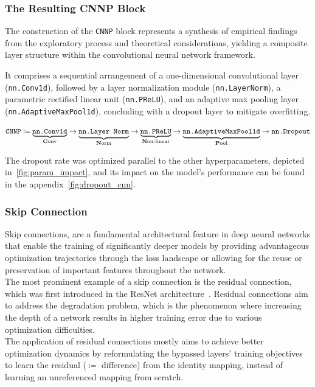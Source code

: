\subsubsection{The Resulting CNNP Block}
\label{subsubsec:cnn_block}

The construction of the \texttt{CNNP} block represents a synthesis of empirical findings from the exploratory process
and theoretical considerations, yielding a composite layer structure within the convolutional neural network framework.

It comprises a sequential arrangement of a one-dimensional convolutional layer (\texttt{nn.Conv1d}), followed by a
layer normalization module (\texttt{nn.LayerNorm}), a parametric rectified linear unit (\texttt{nn.PReLU}), and an
adaptive max pooling layer (\texttt{nn.AdaptiveMaxPool1d}), concluding with a dropout layer to mitigate overfitting.

\[
    \texttt{CNNP} \coloneqq \underbrace{\texttt{nn.Conv1d}}_{\text{\textbf{C}onv}}
    \rightarrow \underbrace{\texttt{nn.Layer Norm}}_{\text{\textbf{N}orm}}
    \rightarrow \underbrace{\texttt{nn.PReLU}}_{\text{\textbf{N}on-linear}}
    \rightarrow \underbrace{\texttt{nn.AdaptiveMaxPool1d}}_{\text{\textbf{P}ool}}
    \rightarrow \texttt{nn.Dropout}
\]

The dropout rate was optimized parallel to the other hyperparameters, depicted in~\autoref{fig:param_impact}, and its
impact on the model's performance can be found in the appendix~\autoref{fig:dropout_cnn}.


\subsubsection{Skip Connection}

Skip connections, are a fundamental architectural feature in deep neural networks that enable the training of significantly
deeper models by providing advantageous optimization trajectories through the loss landscape or allowing for the reuse or
preservation of important features throughout the network. \\
The most prominent example of a skip connection is the residual connection, which was first introduced in the ResNet architecture~\cite{he2015deep}.
Residual connections aim to address the degradation problem, which is the phenomenon where increasing the depth of a network
results in higher training error due to various optimization difficulties. \\
The application of residual connections mostly aims to achieve better optimization dynamics by reformulating the
bypassed layers' training objectives to learn the residual (\( \coloneq \) difference) from the identity mapping, instead
of learning an unreferenced mapping from scratch.

